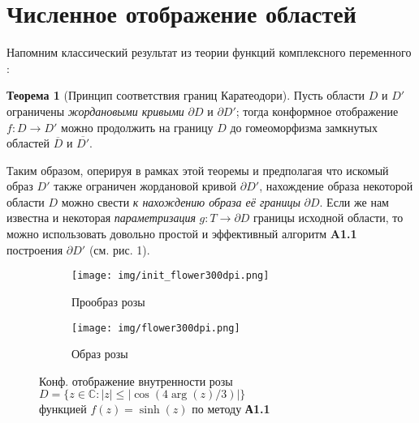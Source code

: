 \documentclass{article}
\theoremstyle{definition}
\newtheorem*{theorem}{Теорема}
\begin{document}
\section{Численное отображение областей}
Напомним классический результат из теории функций комплексного переменного \cite{Shabat}:
\begin{theorem}[Принцип соответствия границ Каратеодори] 
Пусть области $D$ и $D'$ ограничены \textit{жордановыми кривыми} $\partial D$ и $\partial D'$; тогда конформное отображение $f:D\rightarrow D'$ можно продолжить на границу $D$ до гомеоморфизма замкнутых областей $\overline{D}$ и $\overline{D'}$.
\end{theorem} \noindent
Таким образом, оперируя в рамках этой теоремы и предполагая что искомый образ $D'$ также ограничен жордановой кривой $\partial D'$, нахождение образа некоторой области $D$ можно свести \textit{к нахождению образа её границы} $\partial D$. Если же нам известна и некоторая \textit{параметризация} $g:T\rightarrow \partial D$ границы исходной области, то можно использовать довольно простой и эффективный алгоритм \textbf{A1.1} построения $\partial D'$ (см. рис. 1). \vspace*{-0.4cm}
\begin{figure}[h!]
    \centering
    \hspace{-0.5cm}
    \begin{subfigure}{0.48\textwidth}
        \texttt{[image: img/init\_flower300dpi.png]}
        \caption{\; Прообраз розы}
    \end{subfigure} \hspace{0.1cm}
    \begin{subfigure}{0.48\textwidth}
        \texttt{[image: img/flower300dpi.png]}
        \caption{\; Образ розы}
    \end{subfigure} \vspace*{5pt}
    \caption{ \centering Конф. отображение внутренности розы $D=\bigl\{ z\in \mathbb{C}:|z|\leq|\cos(4\arg(z)/3)|\bigr\}$ \\ функцией $f(z)=\sinh(z)$ по методу \textbf{А1.1}}
\end{figure}
\end{document}
